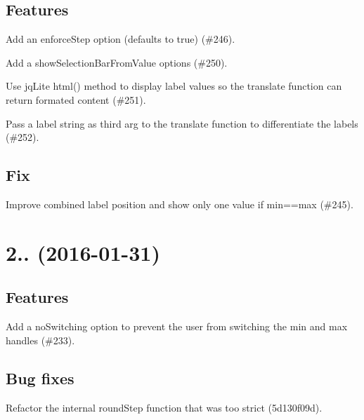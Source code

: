 \subsection*{Features}


\begin{DoxyItemize}
\item Add an {\ttfamily enforce\+Step} option (defaults to true) (\#246).
\item Add a {\ttfamily show\+Selection\+Bar\+From\+Value} options (\#250).
\item Use jq\+Lite html() method to display label values so the translate function can return formated content (\#251).
\item Pass a label string as third arg to the {\ttfamily translate} function to differentiate the labels (\#252).
\end{DoxyItemize}

\subsection*{Fix}


\begin{DoxyItemize}
\item Improve combined label position and show only one value if min==max (\#245).
\end{DoxyItemize}

\section*{2.. (2016-\/01-\/31)}

\subsection*{Features}


\begin{DoxyItemize}
\item Add a {\ttfamily no\+Switching} option to prevent the user from switching the min and max handles (\#233).
\end{DoxyItemize}

\subsection*{Bug fixes}


\begin{DoxyItemize}
\item Refactor the internal {\ttfamily round\+Step} function that was too strict (5d130f09d).
\end{DoxyItemize}

